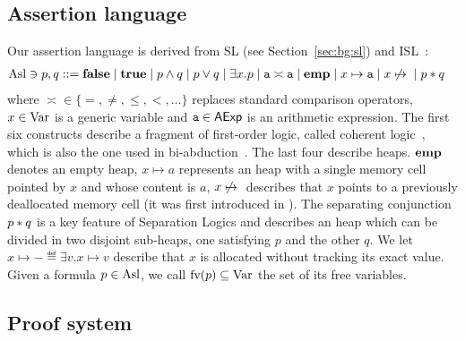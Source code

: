 \subsection{Assertion language}
Our assertion language is derived from SL (see Section~\ref{sec:bg:sl}) and ISL~\cite{RBDDOV20}:
\begin{align*}
	\text{Asl} \ni p, q ::= & \; \textbf{false} \mid \textbf{true} \mid p \land q \mid p \lor q \mid \exists x . p \mid \texttt{a} \asymp \texttt{a} \mid \textbf{emp} \mid x \mapsto \texttt{a} \mid x \not\mapsto{} \mid p * q
\end{align*}
where $\asymp \in \{ =, \neq, \le, <, \dots \}$ replaces standard comparison operators, $x \in \text{Var}$ is a generic variable and $\texttt{a} \in \mathsf{AExp}$ is an arithmetic expression. The first six constructs describe a fragment of first-order logic, called coherent logic~\cite{BC05}, which is also the one used in bi-abduction~\cite{CDOY09}. The last four describe heaps.
$\textbf{emp}$ denotes an empty heap, $x \mapsto a$ represents an heap with a single memory cell pointed by $x$ and whose content is $a$, $x \not\mapsto{}$ describes that $x$ points to a previously deallocated memory cell (it was first introduced in \cite{RBDDOV20}).
The separating conjunction $p * q$ is a key feature of Separation Logics and describes an heap which can be divided in two disjoint sub-heaps, one satisfying $p$ and the other $q$.
We let $x \mapsto - \eqdef \exists v. x \mapsto v$ describe that $x$ is allocated without tracking its exact value.
Given a formula $p \in \text{Asl}$, we call $\text{fv}(p) \subseteq \text{Var}$ the set of its free variables.

\subsection{Proof system}\label{sec:sil:sepsil-proof-system}

